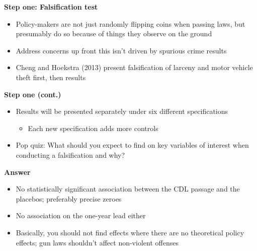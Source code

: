 \documentclass[notes=show]{beamer}
\begin{document}
\begin{frame}[plain]
	\begin{center}
	\textbf{Step one: Falsification test}
	\end{center}
	
	\begin{itemize}
	\item Policy-makers are not just randomly flipping coins when passing laws, but presumably do so because of things they observe on the ground 
	\item Address concerns up front this isn't driven by spurious crime results
	\item Cheng and Hoekstra (2013) present falsification of larceny and motor vehicle theft first, then results
	\end{itemize}
\end{frame}

\begin{frame}[plain]
\begin{center}
\textbf{Step one (cont.)}
\end{center}

\begin{itemize}
	\item Results will be presented separately under six different specifications
		\begin{itemize}
		\item Each new specification adds more controls
		\end{itemize}
	\item Pop quiz: What should you expect to find on key variables of interest when conducting a falsification and why?
\end{itemize}

\end{frame}

\begin{frame}[plain]
\begin{center}
\textbf{Answer}
\end{center}

		\begin{itemize}
		\item No statistically significant association between the CDL passage and the placebos; preferably precise zeroes
		\item No association on the one-year lead either
		\item Basically, you should not find effects where there are no theoretical policy effects; gun laws shouldn't affect non-violent offenses
		\end{itemize}
\end{frame}
\end{document}
